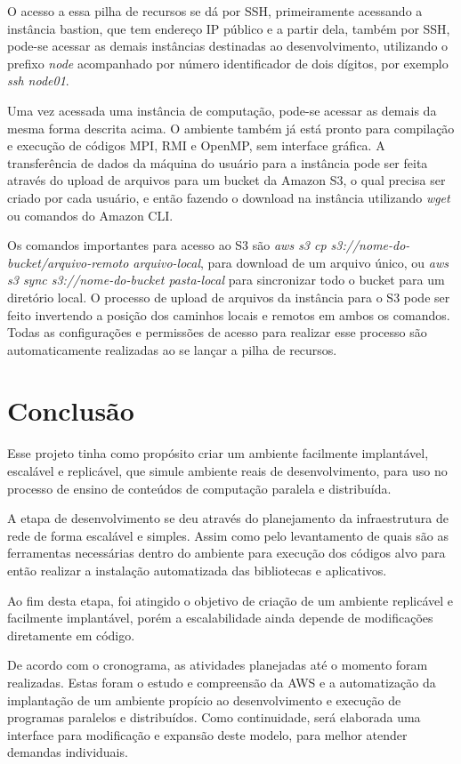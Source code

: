 \documentclass[tg]{mdtufsm}
\begin{document}
O acesso a essa pilha de recursos se dá por SSH, primeiramente acessando a instância bastion, que tem endereço IP público e a partir dela, também por SSH, pode-se acessar as demais instâncias destinadas ao desenvolvimento, utilizando o prefixo \emph{node} acompanhado por número identificador de dois dígitos, por exemplo \emph{ssh node01}.

Uma vez acessada uma instância de computação, pode-se acessar as demais da mesma forma descrita acima. O ambiente também já está pronto para compilação e execução de códigos MPI, RMI e OpenMP, sem interface gráfica. A transferência de dados da máquina do usuário para a instância pode ser feita através do upload de arquivos para um bucket da Amazon S3, o qual precisa ser criado por cada usuário, e então fazendo o download na instância utilizando \emph{wget} ou comandos do Amazon CLI.

Os comandos importantes para acesso ao S3 são \emph{aws s3 cp s3://nome-do-bucket/arquivo-remoto arquivo-local}, para download de um arquivo único, ou \emph{aws s3 sync s3://nome-do-bucket pasta-local} para sincronizar todo o bucket para um diretório local. O processo de upload de arquivos da instância para o S3 pode ser feito invertendo a posição dos caminhos locais e remotos em ambos os comandos. Todas as configurações e permissões de acesso para realizar esse processo são automaticamente realizadas ao se lançar a pilha de recursos.

\chapter{Conclusão}

Esse projeto tinha como propósito criar um ambiente facilmente implantável, escalável e replicável, que simule ambiente reais de desenvolvimento, para uso no processo de ensino de conteúdos de computação paralela e distribuída.

A etapa de desenvolvimento se deu através do planejamento da infraestrutura de rede de forma escalável e simples. Assim como pelo levantamento de quais são as ferramentas necessárias dentro do ambiente para execução dos códigos alvo para então realizar a instalação automatizada das bibliotecas e aplicativos.

Ao fim desta etapa, foi atingido o objetivo de criação de um ambiente replicável e facilmente implantável, porém a escalabilidade ainda depende de modificações diretamente em código.

De acordo com  o cronograma, as atividades planejadas até o momento foram realizadas. Estas foram o estudo e compreensão da AWS e a automatização da implantação de um ambiente propício ao desenvolvimento e execução de programas paralelos e distribuídos. Como continuidade, será elaborada uma interface para modificação e expansão deste modelo, para melhor atender demandas individuais.


\setlength{\baselineskip}{\baselineskip}


\end{document}
